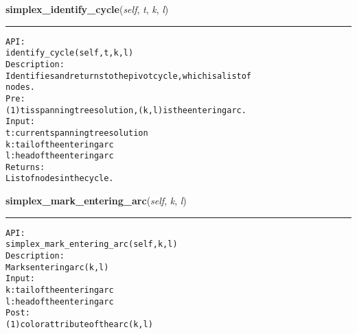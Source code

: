     \label{coinor:gimpy:graph:Graph:simplex_identify_cycle}

    \vspace{0.5ex}

\hspace{.8\funcindent}\begin{boxedminipage}{\funcwidth}

    \raggedright \textbf{simplex\_identify\_cycle}(\textit{self}, \textit{t}, \textit{k}, \textit{l})

    \vspace{-1.5ex}

    \rule{\textwidth}{0.5\fboxrule}
\setlength{\parskip}{2ex}
\begin{alltt}

API:
    identify\_cycle(self, t, k, l)
Description:
    Identifies and returns to the pivot cycle, which is a list of
    nodes.
Pre:
    (1) t is spanning tree solution, (k,l) is the entering arc.
Input:
    t: current spanning tree solution
    k: tail of the entering arc
    l: head of the entering arc
Returns:
    List of nodes in the cycle.
\end{alltt}

\setlength{\parskip}{1ex}
    \end{boxedminipage}

    \label{coinor:gimpy:graph:Graph:simplex_mark_entering_arc}

    \vspace{0.5ex}

\hspace{.8\funcindent}\begin{boxedminipage}{\funcwidth}

    \raggedright \textbf{simplex\_mark\_entering\_arc}(\textit{self}, \textit{k}, \textit{l})

    \vspace{-1.5ex}

    \rule{\textwidth}{0.5\fboxrule}
\setlength{\parskip}{2ex}
\begin{alltt}

API:
    simplex\_mark\_entering\_arc(self, k, l)
Description:
    Marks entering arc (k,l)
Input:
    k: tail of the entering arc
    l: head of the entering arc
Post:
    (1) color attribute of the arc (k,l)
\end{alltt}

\setlength{\parskip}{1ex}
    \end{boxedminipage}

